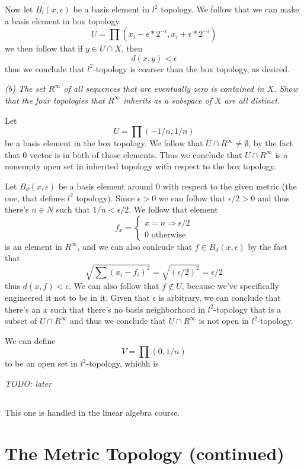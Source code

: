 \documentclass[11pt,oneside,titlepage]{book}
\DeclareMathOperator \ra {\Rightarrow}
\begin{document}
Now let $B_l(x, \epsilon)$ be a basis element in $l^2$ topology.
We follow that we can make a basis element in box topology
$$U = \prod{(x_i - \epsilon * 2^{-i}, x_i + \epsilon * 2^{-i})}$$
we then follow that if $y \in U \cap X$, then
$$d(x, y) < \epsilon$$
thus we conclude that $l^2$-topology is coarser than the box topology, as desired.

\textit{(b) The set $R^\infty$ of all sequences that are eventually zero is contained in $X$.
  Show that the four topologies that $R^\infty$ inherits as a subspace of $X$ are all distinct.}

Let
$$U = \prod{(-1/n, 1/n)}$$
be a basis element in the box topology. We follow that $U \cap R^\infty \neq \emptyset$,
by the fact that $0$ vector is in both of those elements. Thus we conclude that
$U \cap R^\infty$ is a nonempty open set in inherited topology with respect to the box
topology.

Let $B_d(x, \epsilon)$ be a basis element around $0$ with respect to the given metric
(the one, that defines $l^2$ topology). Since $\epsilon > 0$ we can follow that
$\epsilon / 2 > 0$ and thus there's $n \in N$ such that $1/n < \epsilon/2$. We follow that
element
$$f_x =
\begin{cases}
  x = n \ra \epsilon/2  \\
  0 \text{ otherwise }
\end{cases}
$$
is an element in $R^\infty$, and we can also conlcude that $f \in B_d(x, \epsilon)$
by the fact that
$$\sqrt{\sum{(x_i - f_i)^2}} = \sqrt{(\epsilon/2)^2} = \epsilon/2$$
thus $d(x, f) < \epsilon$. We can also follow that $f \notin U$, because
we've specifically engineered it not to be in it. Given that $\epsilon$ is
arbitrary, we can conclude that
there's an $x$ such that there's no basis neighborhood in $l^2$-topology that is
a subset of $U \cap R^\infty$ and thus we conclude that $U \cap R^\infty$ is not open
in $l^2$-topology.

We can define
$$V = \prod{(0, 1/n)}$$
to be an open set in $l^2$-topology, whichh is

\textit{TODO: later}

\subsection{}

This one is handled in the linear algebra course.

\section{The Metric Topology (continued)}
\end{document}
